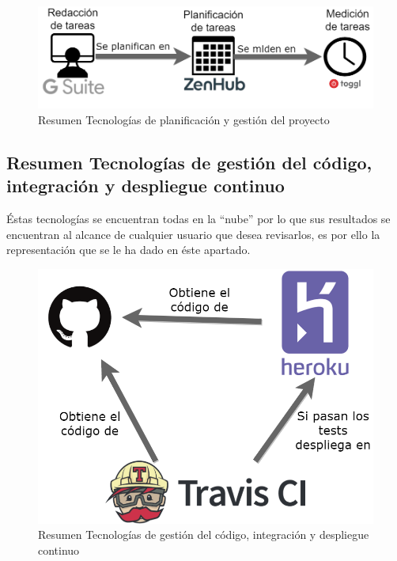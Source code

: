 \documentclass[11pt,openany]{book}
\begin{document}
\begin{figure}[H]
\centering
\includegraphics[totalheight=4cm]{resumenTecnologias/Resumen_Tecnolog_as_de_Planificaci_n.png}
\caption{Resumen Tecnologías de planificación y gestión del proyecto}
\end{figure}

\pagebreak
\subsection{Resumen Tecnologías de gestión del código, integración y despliegue continuo}

Éstas tecnologías se encuentran todas en la ``nube'' por lo que sus resultados se encuentran al alcance de cualquier usuario que desea revisarlos, es por ello la representación que se le ha dado en éste apartado.

\begin{figure}[H]
\centering
\includegraphics[totalheight=8cm]{resumenTecnologias/Resumen_Tecnolog_as_de_Integraciones.png}
\caption{Resumen Tecnologías de gestión del código, integración y despliegue continuo}
\end{figure}

\end{document}
